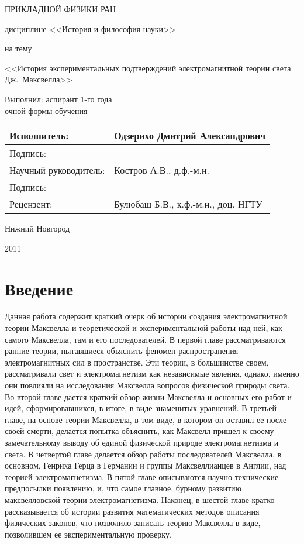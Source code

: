 \documentclass[12pt, oneside, a4paper]{article}
\begin{document}
\begin{titlepage}
\centerline{\large{} ПРИКЛАДНОЙ ФИЗИКИ РАН}
\vspace{3.0cm}
\centerline{\large{}}
\vspace{0.2cm}
\centerline{ дисциплине <<История и философия науки>>}
\vspace{0.3cm}
\centerline{на тему}
\vspace{0.2cm}
\begin{center}
\large
<<История экспериментальных подтверждений электромагнитной теории света Дж.~Максвелла>>
\vspace{1.0cm}
\begin{flushright}
\normalsize
Выполнил: аспирант 1-го года\\очной формы обучения 
\end{flushright}
\normalsize
\begin{flushright}
\begin{tabular}{|>{\flushright}p{3.0cm}|>{\flushleft}p{7.0cm}|}
\hline
Исполнитель: & Одзерихо Дмитрий Александрович\tabularnewline\hline
Подпись: &\tabularnewline\hline
Научный руководитель: & Костров А.В., д.ф.-м.н.\tabularnewline\hline
Подпись: &\tabularnewline\hline
Рецензент: & Булюбаш Б.В., к.ф.-м.н., доц. НГТУ\tabularnewline\hline
\end{tabular}
\end{flushright}
\vfill
\centerline{Нижний Новгород}
\centerline{2011}
\end{center}
\end{titlepage}
\tableofcontents
\newpage
\section{Введение}
Данная работа содержит краткий очерк об истории создания электромагнитной теории Максвелла и теоретической и экспериментальной работы над ней, как самого Максвелла, там и его последователей. В первой главе рассматриваются ранние теории, пытавшиеся объяснить феномен распространения электромагнитных сил в пространстве. Эти теории, в большинстве своем, рассматривали свет и электромагнетизм как независимые явления, однако, именно они повлияли на исследования Максвелла вопросов физической природы света. Во второй главе дается краткий обзор жизни Максвелла и основных его работ и идей, сформировавшихся, в итоге, в виде знаменитых уравнений. В третьей главе, на основе теории Максвелла, в том виде, в котором он оставил ее после своей смерти, делается попытка объяснить, как Максвелл пришел к своему замечательному выводу об единой физической природе электромагнетизма и света. В четвертой главе делается обзор работы последователей Максвелла, в основном, Генриха Герца в Германии и группы Максвеллианцев в Англии, над теорией электромагнетизма. В пятой главе описываются научно-технические предпосылки появлению, и, что самое главное, бурному развитию максвелловской теории электромагнетизма. Наконец, в шестой главе кратко  рассказывается об истории развития математических методов описания физических законов, что позволило записать теорию Максвелла в виде, позволившем ее экспериментальную проверку.
\end{document}

